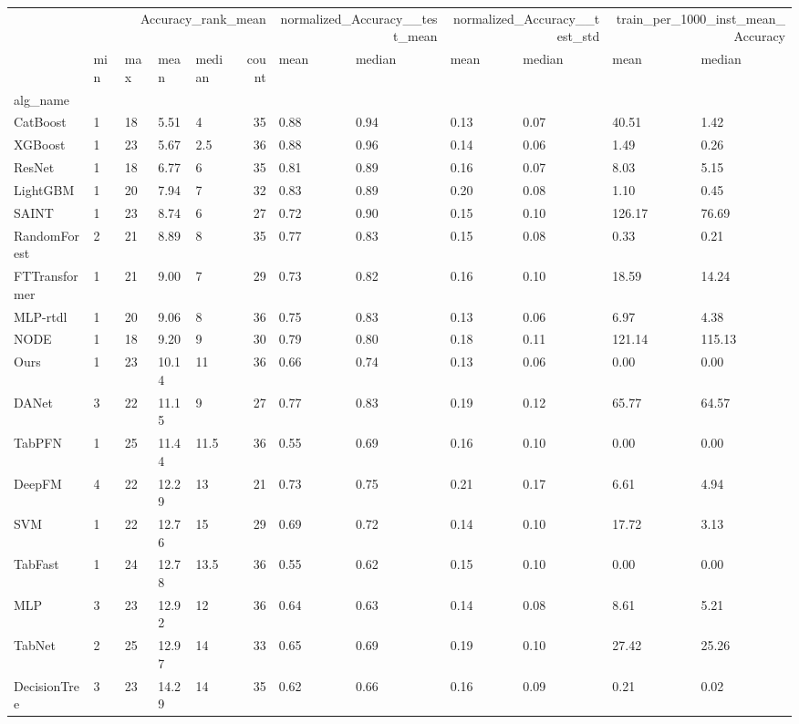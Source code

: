 \begin{tabular}{lllllrllllll}
\toprule
 & \multicolumn{5}{r}{Accuracy_rank_mean} & \multicolumn{2}{r}{normalized_Accuracy__test_mean} & \multicolumn{2}{r}{normalized_Accuracy__test_std} & \multicolumn{2}{r}{train_per_1000_inst_mean_Accuracy} \\
 & min & max & mean & median & count & mean & median & mean & median & mean & median \\
alg_name &  &  &  &  &  &  &  &  &  &  &  \\
\midrule
CatBoost & 1 & 18 & 5.51 & 4 & 35 & 0.88 & 0.94 & 0.13 & 0.07 & 40.51 & 1.42 \\
XGBoost & 1 & 23 & 5.67 & 2.5 & 36 & 0.88 & 0.96 & 0.14 & 0.06 & 1.49 & 0.26 \\
ResNet & 1 & 18 & 6.77 & 6 & 35 & 0.81 & 0.89 & 0.16 & 0.07 & 8.03 & 5.15 \\
LightGBM & 1 & 20 & 7.94 & 7 & 32 & 0.83 & 0.89 & 0.20 & 0.08 & 1.10 & 0.45 \\
SAINT & 1 & 23 & 8.74 & 6 & 27 & 0.72 & 0.90 & 0.15 & 0.10 & 126.17 & 76.69 \\
RandomForest & 2 & 21 & 8.89 & 8 & 35 & 0.77 & 0.83 & 0.15 & 0.08 & 0.33 & 0.21 \\
FTTransformer & 1 & 21 & 9.00 & 7 & 29 & 0.73 & 0.82 & 0.16 & 0.10 & 18.59 & 14.24 \\
MLP-rtdl & 1 & 20 & 9.06 & 8 & 36 & 0.75 & 0.83 & 0.13 & 0.06 & 6.97 & 4.38 \\
NODE & 1 & 18 & 9.20 & 9 & 30 & 0.79 & 0.80 & 0.18 & 0.11 & 121.14 & 115.13 \\
Ours & 1 & 23 & 10.14 & 11 & 36 & 0.66 & 0.74 & 0.13 & 0.06 & 0.00 & 0.00 \\
DANet & 3 & 22 & 11.15 & 9 & 27 & 0.77 & 0.83 & 0.19 & 0.12 & 65.77 & 64.57 \\
TabPFN & 1 & 25 & 11.44 & 11.5 & 36 & 0.55 & 0.69 & 0.16 & 0.10 & 0.00 & 0.00 \\
DeepFM & 4 & 22 & 12.29 & 13 & 21 & 0.73 & 0.75 & 0.21 & 0.17 & 6.61 & 4.94 \\
SVM & 1 & 22 & 12.76 & 15 & 29 & 0.69 & 0.72 & 0.14 & 0.10 & 17.72 & 3.13 \\
TabFast & 1 & 24 & 12.78 & 13.5 & 36 & 0.55 & 0.62 & 0.15 & 0.10 & 0.00 & 0.00 \\
MLP & 3 & 23 & 12.92 & 12 & 36 & 0.64 & 0.63 & 0.14 & 0.08 & 8.61 & 5.21 \\
TabNet & 2 & 25 & 12.97 & 14 & 33 & 0.65 & 0.69 & 0.19 & 0.10 & 27.42 & 25.26 \\
DecisionTree & 3 & 23 & 14.29 & 14 & 35 & 0.62 & 0.66 & 0.16 & 0.09 & 0.21 & 0.02 \\

\end{tabular}
